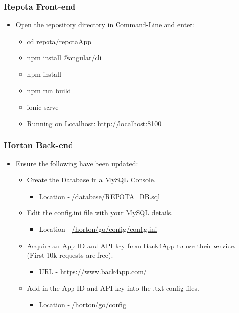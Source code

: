\newpage
\subsubsection{Repota Front-end}
\begin{itemize}
  \item Open the repository directory in Command-Line and enter:
    \begin{itemize}
    \item cd repota/repotaApp
    \item npm install @angular/cli
    \item npm install
    \item npm run build
    \item ionic serve
    \end{itemize}
\begin{itemize}
\item Running on Localhost: \url{http://localhost:8100}
\end{itemize}
\end{itemize}

\subsubsection{Horton Back-end}
\begin{itemize}
  \item Ensure the following have been updated:
    \begin{itemize}
    \item Create the Database in a MySQL Console.
        \begin{itemize}
            \item Location - \url{/database/REPOTA_DB.sql}
        \end{itemize}
    \item Edit the config.ini file with your MySQL details.
        \begin{itemize}
            \item Location - \url{/horton/go/config/config.ini}
        \end{itemize}
    \item Acquire an App ID and API key from Back4App to use their service. (First 10k requests are free).
        \begin{itemize}
            \item URL - \url{https://www.back4app.com/}
        \end{itemize}
    \item Add in the App ID and API key into the .txt config files.
        \begin{itemize}
            \item Location - \url{/horton/go/config}
        \end{itemize}
    \end{itemize}
\end{itemize}

